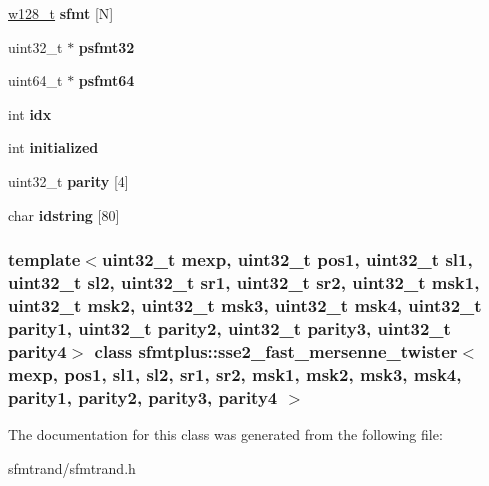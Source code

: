 \begin{DoxyCompactItemize}
\item 
\hypertarget{classsfmtplus_1_1sse2__fast__mersenne__twister_ab0eb025388f2016557c5faf801ac1b65}{
\hyperlink{unionsfmtplus_1_1sse2__fast__mersenne__twister_1_1w128__t}{w128\-\_\-t} {\bfseries sfmt} \mbox{[}\-N\mbox{]}}
\label{classsfmtplus_1_1sse2__fast__mersenne__twister_ab0eb025388f2016557c5faf801ac1b65}

\item 
\hypertarget{classsfmtplus_1_1sse2__fast__mersenne__twister_a4607224454b9e298b49b2db750d36885}{
uint32\-\_\-t $\ast$ {\bfseries psfmt32}}
\label{classsfmtplus_1_1sse2__fast__mersenne__twister_a4607224454b9e298b49b2db750d36885}

\item 
\hypertarget{classsfmtplus_1_1sse2__fast__mersenne__twister_aba210954cadedf9020db16b1e09274a0}{
uint64\-\_\-t $\ast$ {\bfseries psfmt64}}
\label{classsfmtplus_1_1sse2__fast__mersenne__twister_aba210954cadedf9020db16b1e09274a0}

\item 
\hypertarget{classsfmtplus_1_1sse2__fast__mersenne__twister_a985a8088290744af5893c25144aef58c}{
int {\bfseries idx}}
\label{classsfmtplus_1_1sse2__fast__mersenne__twister_a985a8088290744af5893c25144aef58c}

\item 
\hypertarget{classsfmtplus_1_1sse2__fast__mersenne__twister_aa0e6fe3e559895c1b65c71d39dbe30e3}{
int {\bfseries initialized}}
\label{classsfmtplus_1_1sse2__fast__mersenne__twister_aa0e6fe3e559895c1b65c71d39dbe30e3}

\item 
\hypertarget{classsfmtplus_1_1sse2__fast__mersenne__twister_a8486601a7ed82c754346b6fdabed7ac5}{
uint32\-\_\-t {\bfseries parity} \mbox{[}4\mbox{]}}
\label{classsfmtplus_1_1sse2__fast__mersenne__twister_a8486601a7ed82c754346b6fdabed7ac5}

\item 
\hypertarget{classsfmtplus_1_1sse2__fast__mersenne__twister_a573de14c1b184021d87682717a36e129}{
char {\bfseries idstring} \mbox{[}80\mbox{]}}
\label{classsfmtplus_1_1sse2__fast__mersenne__twister_a573de14c1b184021d87682717a36e129}

\end{DoxyCompactItemize}
\subsubsection*{template$<$uint32\-\_\-t mexp, uint32\-\_\-t pos1, uint32\-\_\-t sl1, uint32\-\_\-t sl2, uint32\-\_\-t sr1, uint32\-\_\-t sr2, uint32\-\_\-t msk1, uint32\-\_\-t msk2, uint32\-\_\-t msk3, uint32\-\_\-t msk4, uint32\-\_\-t parity1, uint32\-\_\-t parity2, uint32\-\_\-t parity3, uint32\-\_\-t parity4$>$ class sfmtplus\-::sse2\-\_\-fast\-\_\-mersenne\-\_\-twister$<$ mexp, pos1, sl1, sl2, sr1, sr2, msk1, msk2, msk3, msk4, parity1, parity2, parity3, parity4 $>$}



\-The documentation for this class was generated from the following file\-:\begin{DoxyCompactItemize}
\item 
sfmtrand/sfmtrand.\-h\end{DoxyCompactItemize}
